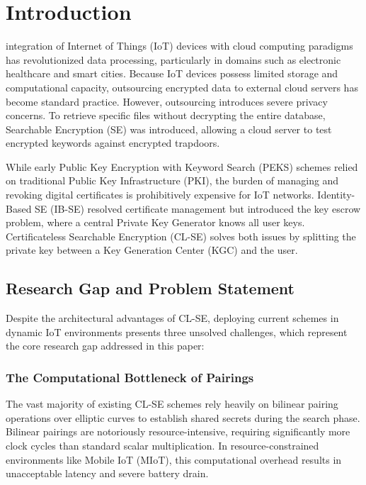 \documentclass[10pt,journal,compsoc]{IEEEtran}
\begin{document}
\section{Introduction}\label{sec:intro}

 integration of Internet of Things (IoT) devices with cloud computing paradigms has revolutionized data processing, particularly in domains such as electronic healthcare and smart cities. Because IoT devices possess limited storage and computational capacity, outsourcing encrypted data to external cloud servers has become standard practice. However, outsourcing introduces severe privacy concerns. To retrieve specific files without decrypting the entire database, Searchable Encryption (SE) was introduced, allowing a cloud server to test encrypted keywords against encrypted trapdoors. 

While early Public Key Encryption with Keyword Search (PEKS) schemes relied on traditional Public Key Infrastructure (PKI), the burden of managing and revoking digital certificates is prohibitively expensive for IoT networks. Identity-Based SE (IB-SE) resolved certificate management but introduced the key escrow problem, where a central Private Key Generator knows all user keys. Certificateless Searchable Encryption (CL-SE) solves both issues by splitting the private key between a Key Generation Center (KGC) and the user.

\subsection{Research Gap and Problem Statement}
Despite the architectural advantages of CL-SE, deploying current schemes in dynamic IoT environments presents three unsolved challenges, which represent the core research gap addressed in this paper:

\subsubsection{The Computational Bottleneck of Pairings}
The vast majority of existing CL-SE schemes \cite{lu2023certificateless, elhabob2020efficient} rely heavily on bilinear pairing operations over elliptic curves to establish shared secrets during the search phase. Bilinear pairings are notoriously resource-intensive, requiring significantly more clock cycles than standard scalar multiplication. In resource-constrained environments like Mobile IoT (MIoT), this computational overhead results in unacceptable latency and severe battery drain.
\end{document}
